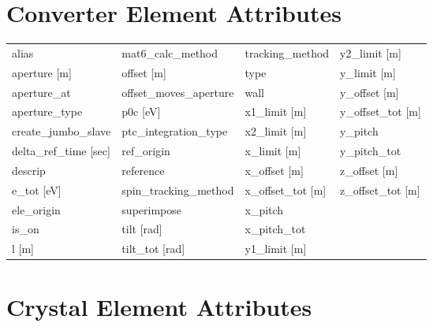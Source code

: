  \section{Converter Element Attributes}
 \label{s:list.converter}
 
 \begin{tabular}{llll} \toprule
alias                          & mat6_calc_method               & tracking_method                & y2_limit [m]                   \\
aperture [m]                   & offset [m]                     & type                           & y_limit [m]                    \\
aperture_at                    & offset_moves_aperture          & wall                           & y_offset [m]                   \\
aperture_type                  & p0c [eV]                       & x1_limit [m]                   & y_offset_tot [m]               \\
create_jumbo_slave             & ptc_integration_type           & x2_limit [m]                   & y_pitch                        \\
delta_ref_time [sec]           & ref_origin                     & x_limit [m]                    & y_pitch_tot                    \\
descrip                        & reference                      & x_offset [m]                   & z_offset [m]                   \\
e_tot [eV]                     & spin_tracking_method           & x_offset_tot [m]               & z_offset_tot [m]               \\
ele_origin                     & superimpose                    & x_pitch                        &                                \\
is_on                          & tilt [rad]                     & x_pitch_tot                    &                                \\
l [m]                          & tilt_tot [rad]                 & y1_limit [m]                   &                                \\
 \bottomrule
 \end{tabular}
 \vfill
 
 \section{Crystal Element Attributes}
 \label{s:list.crystal}
 
